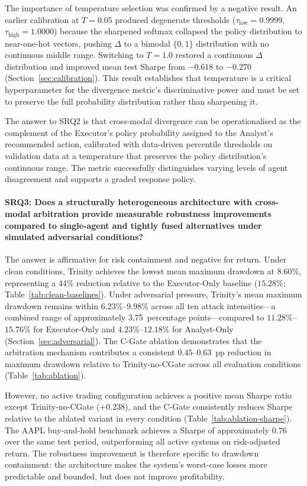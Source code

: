 The importance of temperature selection was confirmed by a negative result.
An earlier calibration at $T = 0.05$ produced degenerate thresholds
($\tau_{\text{low}} = 0.9999$, $\tau_{\text{high}} = 1.0000$) because the
sharpened softmax collapsed the policy distribution to near-one-hot vectors,
pushing $\Delta$ to a bimodal $\{0, 1\}$ distribution with no continuous
middle range. Switching to $T = 1.0$ restored a continuous $\Delta$
distribution and improved mean test Sharpe from $-0.618$ to $-0.270$
(Section~\ref{sec:calibration}). This result establishes that temperature
is a critical hyperparameter for the divergence metric's discriminative
power and must be set to preserve the full probability distribution rather
than sharpening it.

The answer to SRQ2 is that cross-modal divergence can be operationalised as
the complement of the Executor's policy probability assigned to the Analyst's
recommended action, calibrated with data-driven percentile thresholds on
validation data at a temperature that preserves the policy distribution's
continuous range. The metric successfully distinguishes varying levels of
agent disagreement and supports a graded response policy.

\paragraph{SRQ3: Does a structurally heterogeneous architecture with
cross-modal arbitration provide measurable robustness improvements compared
to single-agent and tightly fused alternatives under simulated adversarial
conditions?}

The answer is affirmative for risk containment and negative for return. Under
clean conditions, Trinity achieves the lowest mean maximum drawdown at
$8.60\%$, representing a 44\% reduction relative to the Executor-Only baseline
($15.28\%$; Table~\ref{tab:clean-baselines}). Under adversarial pressure,
Trinity's mean maximum drawdown remains within $6.23\%$--$9.98\%$ across all
ten attack intensities---a combined range of approximately 3.75~percentage
points---compared to $11.28\%$--$15.76\%$ for Executor-Only and
$4.23\%$--$12.18\%$ for Analyst-Only (Section~\ref{sec:adversarial}). The
C-Gate ablation demonstrates that the arbitration mechanism contributes a
consistent $0.45$--$0.63$~pp reduction in maximum drawdown relative to
Trinity-no-CGate across all evaluation conditions
(Table~\ref{tab:ablation}).

However, no active trading configuration achieves a positive mean Sharpe ratio
except Trinity-no-CGate ($+0.238$), and the C-Gate consistently reduces
Sharpe relative to the ablated variant in every condition
(Table~\ref{tab:ablation-sharpe}). The AAPL buy-and-hold benchmark achieves a
Sharpe of approximately $0.76$ over the same test period, outperforming all
active systems on risk-adjusted return. The robustness improvement is therefore
specific to drawdown containment: the architecture makes the system's worst-case
losses more predictable and bounded, but does not improve profitability.

